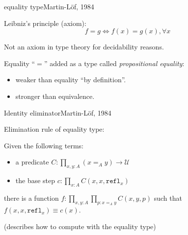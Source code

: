 \documentclass[english,draft]{beamer}
\begin{document}
\begin{frame}{equality type}{Martin-L\"of, 1984}
    
    Leibniz's principle (axiom):
         $$f = g \Leftrightarrow f(x) = g(x), \forall x$$
    
    Not an axiom in type theory for decidability reasons.
    
    \pause
    Equality ``$=$'' added as a type called \emph{propositional equality}:

    \begin{itemize}
        \item weaker than equality ``by definition''.
        \item stronger than equivalence.
    \end{itemize}

\end{frame}

\begin{frame}{Identity eliminator}{Martin-L\"of, 1984}

       Elimination rule of equality type:

    \begin{definition}
            Given the following terms:
        \begin{itemize}
            \item a predicate $C : \prod_{x,y:A} (x =_A y) \rightarrow \mathcal{U}$
            \item the base step $c:\prod_{x:A} C(x,x,\texttt{refl}_x)$
        \end{itemize}
            there is a function $f: \prod_{x,y:A} \prod_{p:x=_Ay}C(x,y,p)$ such that $f(x,x,\texttt{refl}_x) \equiv c(x).$
        
    \end{definition}

    \pause

    (describes how to compute with the equality type)
    
\end{frame}
\end{document}
